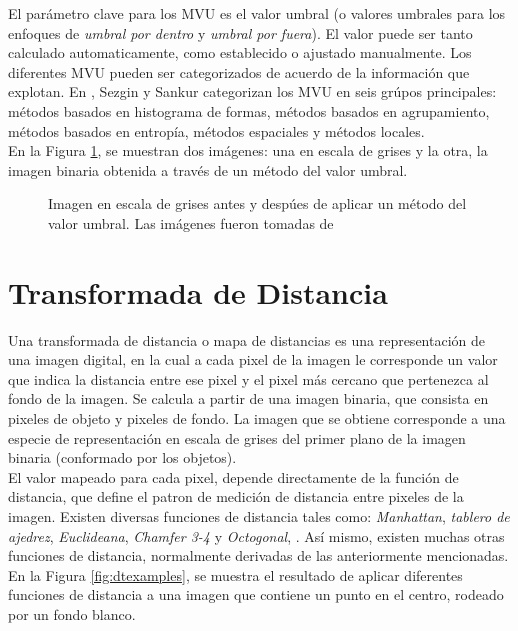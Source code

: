 El par\'ametro clave para los MVU es el valor umbral (o valores umbrales para los enfoques de
\emph{umbral por dentro} y \emph{umbral por fuera}). El valor puede ser tanto calculado
automaticamente, como establecido o ajustado manualmente. Los diferentes MVU pueden ser categorizados 
de acuerdo de la informaci\'on que explotan. En \cite[p.147]{thres}, Sezgin y Sankur
categorizan los MVU en seis gr\'upos principales: m\'etodos basados en histograma de formas,  
m\'etodos basados en agrupamiento, m\'etodos basados en entrop\'ia, m\'etodos espaciales y
m\'etodos locales.\\

En la Figura \ref{fig:thres1}, se muestran dos im\'agenes: una en escala de grises y la 
otra, la imagen binaria obtenida a trav\'es de un m\'etodo del valor umbral.

\begin{figure}[h t b p ! H]
  \centering
\qquad
  \caption[Imagen en escala de grises antes y desp\'ues de aplicar un m\'etodo del valor umbral ]{Imagen en escala de grises antes y desp\'ues de 
    aplicar un m\'etodo del valor umbral. Las im\'agenes fueron tomadas de \cite{web:thresholding}}
  \label{fig:thres1}
\end{figure}

\section{Transformada de Distancia}
\label{sec:dt}

Una transformada de distancia o mapa de distancias es una representaci\'on de
una imagen digital, en la cual a cada pixel de la imagen le corresponde
un valor que indica la distancia entre ese pixel y el pixel m\'as cercano que pertenezca
al fondo de la imagen. Se calcula a partir de una imagen binaria, que consista
en pixeles de objeto y pixeles de fondo. La imagen que se obtiene corresponde a
una especie de representaci\'on en escala de grises del primer plano de la imagen
binaria (conformado por los objetos).\\
El valor mapeado para cada pixel, depende directamente de la funci\'on de distancia,
que define el patron de medici\'on de distancia entre pixeles de la imagen. Existen
diversas funciones de distancia tales como: \emph{Manhattan},
\emph{tablero de ajedrez}, \emph{Euclideana}, \emph{Chamfer 3-4} y \emph{Octogonal}, 
\cite[p.363]{dtresearch}. As\'i mismo, existen muchas otras funciones de
distancia, normalmente derivadas de las anteriormente mencionadas.
En la Figura \ref{fig:dtexamples}, se muestra el resultado de aplicar 
diferentes funciones de distancia a una imagen que contiene un punto en el centro,
rodeado por un fondo blanco.

